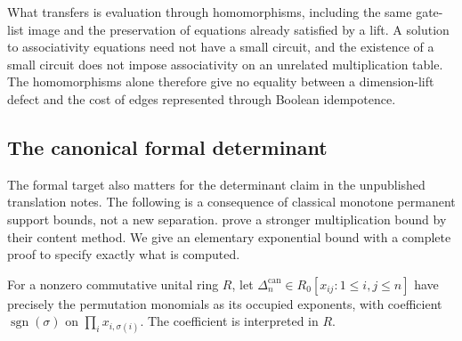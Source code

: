 \documentclass[11pt]{article}
\theoremstyle{definition}
\theoremstyle{remark}
\begin{document}
What transfers is evaluation through homomorphisms, including the same gate-list image and the preservation of equations already satisfied by a lift. A solution to associativity equations need not have a small circuit, and the existence of a small circuit does not impose associativity on an unrelated multiplication table. The homomorphisms alone therefore give no equality between a dimension-lift defect and the cost of edges represented through Boolean idempotence.

\subsection{The canonical formal determinant}
The formal target also matters for the determinant claim in the unpublished translation notes. The following is a consequence of classical monotone permanent support bounds, not a new separation. \citet[Section~4.3, pp.~887--889]{JS} prove a stronger multiplication bound by their content method. We give an elementary exponential bound with a complete proof to specify exactly what is computed.

For a nonzero commutative unital ring $R$, let $\Delta_n^{\mathrm{can}}\in R_0[x_{ij}:1\le i,j\le n]$ have precisely the permutation monomials as its occupied exponents, with coefficient $\operatorname{sgn}(\sigma)$ on $\prod_i x_{i,\sigma(i)}$. The coefficient is interpreted in $R$.
\end{document}
